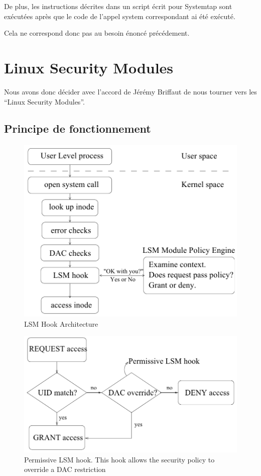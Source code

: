 \documentclass[pdftex,a4paper,titlepage,11pt,openright]{article}
\begin{document}
De plus, les instructions décrites dans un script écrit pour Systemtap sont exécutées après que le code de l'appel system correspondant ai été exécuté.


Cela ne correspond donc pas au besoin énoncé précédement.


\newpage


\section{Linux Security Modules}

Nous avons donc décider avec l'accord de Jérémy Briffaut de nous tourner vers les ``Linux Security Modules''.

\subsection{Principe de fonctionnement}

\begin{figure}[hb]
	\centering
	\includegraphics[scale=0.45]{lsm1.png}
	\caption{LSM Hook Architecture \cite{LSMINTRO}}
\end{figure}

\begin{figure}[hb]
	\centering
	\includegraphics[scale=0.45]{lsm2.png}
	\caption{Permissive LSM hook. This hook allows the security policy to override a DAC restriction \cite{LSMINTRO}}
\end{figure}
\end{document}

